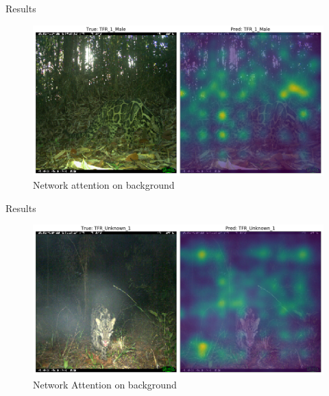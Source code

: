 \documentclass[10pt]{beamer}
\begin{document}
\begin{frame}{Results}
	\centering
	\begin{figure}
		\includegraphics[width=\columnwidth]{images/result_leo_3.png}
		\caption{Network attention on background}
	\end{figure}
\end{frame}



\begin{frame}{Results}
	\centering
	\begin{figure}
		\includegraphics[width=\columnwidth]{images/result_leo_2.png}
		\caption{Network Attention on background}
	\end{figure}
\end{frame}

\end{document}

